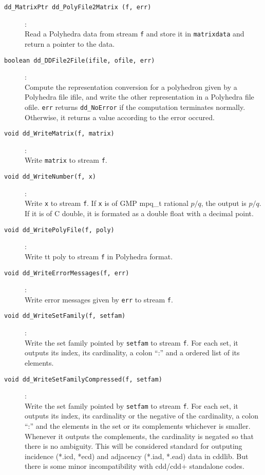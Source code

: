 \documentclass[11pt]{article}
\newcommand {\0} {{\bf 0}}
\begin{document}
\begin{description}

\item[{\tt dd\_MatrixPtr dd\_PolyFile2Matrix (f, err)}]:\\
Read a Polyhedra data from stream {\tt f} and store it in {\tt matrixdata}
and return a pointer to the data.

\item[{\tt boolean dd\_DDFile2File(ifile, ofile, err)}]:\\
Compute the representation conversion for a polyhedron given
by a Polyhedra file ifile, and write the other representation
in a Polyhedra file ofile.  {\tt *err}
returns {\tt dd\_NoError} if the computation terminates normally.  Otherwise,
it returns a value according to the error occured.

\item[{\tt void dd\_WriteMatrix(f, matrix)}]:\\
Write {\tt  matrix} to stream {\tt f}.

\item[{\tt void dd\_WriteNumber(f, x)}]:\\
Write {\tt x} to stream {\tt f}.  If {\tt x} is of GMP mpq\_t rational $p/q$,
the output is $p/q$.  If it is of C double, it is formated as a double float
with a decimal point.

\item[{\tt void dd\_WritePolyFile(f, poly)}]:\\
Write {tt poly} to stream {\tt f} in Polyhedra format.

\item[{\tt void dd\_WriteErrorMessages(f, err)}]:\\
Write error messages given by {\tt err} to stream {\tt f}.

\item[{\tt void dd\_WriteSetFamily(f, setfam)}]:\\
Write the set family pointed by {\tt setfam} to stream {\tt f}.
For each set, it outputs its index, its cardinality,
a colon ``:'' and a ordered list of its elements.

\item[{\tt void dd\_WriteSetFamilyCompressed(f, setfam)}]:\\
Write the set family pointed by {\tt setfam} to stream {\tt f}.
For each set, it outputs its index, its cardinality or the
negative of the cardinality, a colon ``:''
 and the elements in the set or its complements whichever is smaller.
Whenever it outputs the complements, the cardinality is negated
so that there is no ambiguity.
This will be considered standard for
outputing incidence (*.icd, *ecd) and adjacency 
(*.iad, *.ead) data in cddlib.   But there is some minor incompatibility
with cdd/cdd+ standalone codes.


\end{description}
\end{document}
